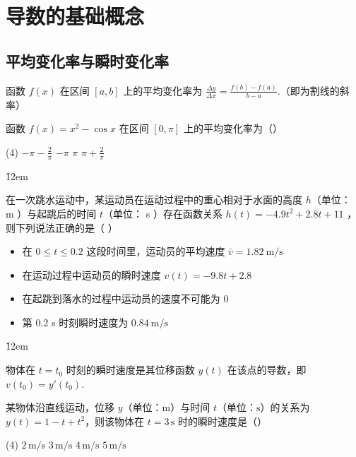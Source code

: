 \section{导数的基础概念}

\subsection{平均变化率与瞬时变化率}

\begin{theorem}[平均变化率]
    函数 $f(x)$ 在区间 $[a, b]$ 上的平均变化率为 $\frac{\Delta y}{\Delta x} = \frac{f(b) - f(a)}{b - a}$.（即为割线的斜率）
\end{theorem}
\begin{example}
    函数 $f(x) = x^{2} - \cos x$ 在区间 $\left[ 0, \pi \right]$ 上的平均变化率为（\quad）
    \begin{tasks}(4)
        \task $- \pi - \frac{2}{\pi}$
        \task $- \pi$
        \task $\pi$
        \task $\pi + \frac{2}{\pi}$
    \end{tasks}
\end{example}

\v{12em}

\begin{example}
    在一次跳水运动中，某运动员在运动过程中的重心相对于水面的高度 $h$（单位： m ）与起跳后的时间 $t$（单位： s ）存在函数关系 $h(t)=-4.9 t^2+2.8 t+11$ ，则下列说法正确的是（ \quad）
    \begin{itemize}
        \item 在 $0 \leq t \leq 0.2$ 这段时间里，运动员的平均速度 $\bar{v}=1.82 \mathrm{~m} / \mathrm{s}$
        \item 在运动过程中运动员的瞬时速度 $v(t)=-9.8 t+2.8$
        \item 在起跳到落水的过程中运动员的速度不可能为 0
        \item 第 0.2 s 时刻瞬时速度为 $0.84 \mathrm{~m} / \mathrm{s}$
    \end{itemize}
\end{example}

\v{12em}

\begin{theorem}[瞬时速度的物理意义]
    物体在 $t=t_0$ 时刻的瞬时速度是其位移函数 $y(t)$ 在该点的导数，即 $v(t_0) = y'(t_0)$.
\end{theorem}

\begin{example}
    某物体沿直线运动，位移 $y$（单位：$\mathrm{m}$）与时间 $t$（单位：$\mathrm{s}$）的关系为 $y(t) = 1 - t + t^{2}$，则该物体在 $t = 3\,\mathrm{s}$ 时的瞬时速度是（\quad）
    \begin{tasks}(4)
        \task $2\,\mathrm{m/s}$
        \task $3\,\mathrm{m/s}$
        \task $4\,\mathrm{m/s}$
        \task $5\,\mathrm{m/s}$
    \end{tasks}
\end{example}

